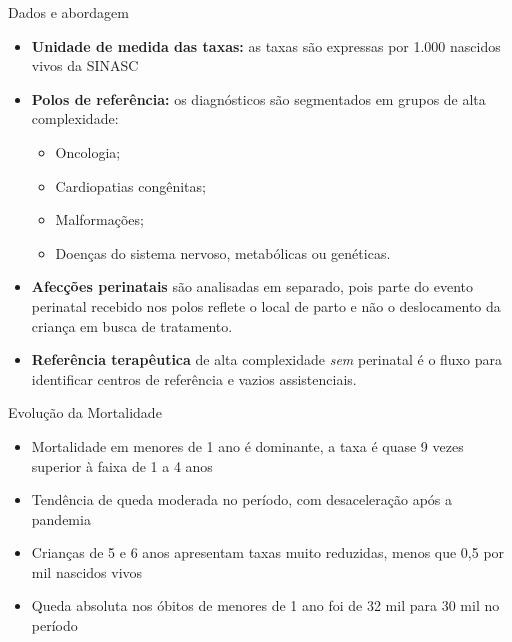 \documentclass[
  ignorenonframetext,
  brazilian,
]{beamer}
\providecommand{\tightlist}{%
  \setlength{\itemsep}{0pt}\setlength{\parskip}{0pt}}
\begin{document}
\begin{frame}{Dados e abordagem}
\protect{}\label{dados-e-abordagem-2}
\begin{itemize}
\item
  \textbf{Unidade de medida das taxas:} as taxas são expressas por 1.000
  nascidos vivos da SINASC\\
\item
  \textbf{Polos de referência:} os diagnósticos são segmentados em
  grupos de alta complexidade:\\

  \begin{itemize}
  \tightlist
  \item
    Oncologia;\\
  \item
    Cardiopatias congênitas;\\
  \item
    Malformações;\\
  \item
    Doenças do sistema nervoso, metabólicas ou genéticas.\\
  \end{itemize}
\item
  \textbf{Afecções perinatais} são analisadas em separado, pois parte do
  evento perinatal recebido nos polos reflete o local de parto e não o
  deslocamento da criança em busca de tratamento.\\
\item
  \textbf{Referência terapêutica} de alta complexidade \emph{sem}
  perinatal é o fluxo para identificar centros de referência e vazios
  assistenciais.\\
\end{itemize}
\end{frame}

\begin{frame}{Evolução da Mortalidade}
\protect{}\label{evoluuxe7uxe3o-da-mortalidade}
\begin{itemize}
\tightlist
\item
  Mortalidade em menores de 1 ano é dominante, a taxa é quase 9 vezes
  superior à faixa de 1 a 4 anos
\item
  Tendência de queda moderada no período, com desaceleração após a
  pandemia
\item
  Crianças de 5 e 6 anos apresentam taxas muito reduzidas, menos que 0,5
  por mil nascidos vivos
\item
  Queda absoluta nos óbitos de menores de 1 ano foi de 32 mil para 30
  mil no período
\end{itemize}
\end{frame}
\end{document}
